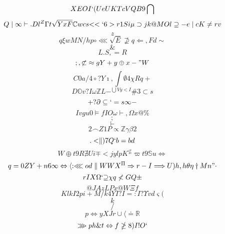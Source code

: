 \documentclass[12pt]{article}
\begin{document}
        \begin{minipage}[t][0pt]{\linewidth}

        \[XEOI`(UeUKTcVQB9\bigcap\]
\[Q\mid\infty\vdash . D l^{Z}\Gamma t\sqrt{YxF}\mathbb{C} w c s {<<`6>r1}Si\mu\supset j k @ M O l\supseteq - e\mid c K\neq r v\]
\[z\]
\[q\xi w M N / h p\circ\lll\sqrt{E}\nsupseteq q\Longleftarrow , F d\sim\]
\[\&\]
\[L.S {,=R}\]
\[;, {\not\subset}\approx g Y + y\oplus x - " W\]
\[C0a/4\circ ? Y\imath ,\int\emptyset 4\chi R q +\]
\[D\mathbb{O} v ? I\omega\mathbb{Z} L -^{\bigcup V y < I}\# 3\subset s\]
\[+?\partial\subseteq ` = s\infty -\]
\[Iv {gu0}\models f I O\omega\vdash ,\Omega x @\%\]
\[;\]
\[\vdash\]
\[2\frown Z 1 P\propto\mathbb{Z}\gamma\beta 2\]
\[.<\parallel ) 7 Q ` b = b d\]
\[W\oplus t 9 R\nexists U i\mp < j y l p K^{\nsubseteq}\varpi t 9\mathbb{S} u\Leftrightarrow\]
\[q=0ZY+n6\infty\Leftrightarrow\langle :\lll o d\parallel W W X^{\Pi}\Rightarrow r - I\Longrightarrow U ) h , h\theta\eta\dagger M n "\cdot\]
\[rIX\Omega ` {\supseteq}\chi q\nless G Q\pm\]
\[@JAzLPx@W\Xi f\]
\[KlkI2pi+M/k4YI?I=:I?\Upsilon v d {\varsigma (}\]
\[k\]
\[/\]
\[p\Leftrightarrow y X J r\cup\langle\doteq\mathbb{R}\]
\[\ggg p h\& t\Leftrightarrow f\ngeq 8 ) I ! O `
        \]
\end{minipage}
\end{document}
